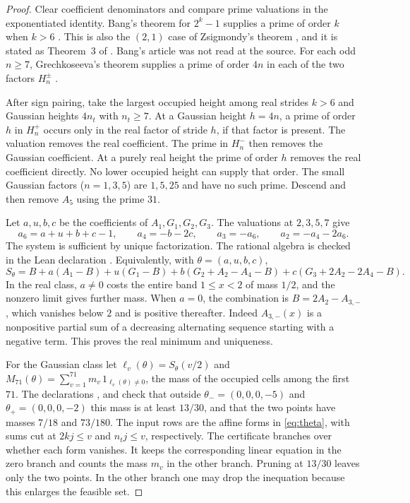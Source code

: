 \documentclass[11pt]{article}
\begin{document}
\begin{proof}
Clear coefficient denominators and compare prime valuations in the exponentiated identity. Bang's theorem for $2^k-1$ supplies a prime of order $k$ when $k>6$ \cite[pp.~70--80]{bang}. This is also the $(2,1)$ case of Zsigmondy's theorem \cite[\S XII, pp.~282--283]{zsigmondy}, and it is stated as Theorem~3 of \cite[p.~913]{bbg}. Bang's article was not read at the source. For each odd $n\ge7$, Grechkoseeva's theorem supplies a prime of order $4n$ in each of the two factors $H_n^\pm$ \cite[Theorem~2, p.~2, Suzuki case $(v,n,m)=(2,4,n)$]{grech}.

After sign pairing, take the largest occupied height among real strides $k>6$ and Gaussian heights $4n_t$ with $n_t\ge7$. At a Gaussian height $h=4n$, a prime of order $h$ in $H_n^+$ occurs only in the real factor of stride $h$, if that factor is present. The valuation removes the real coefficient. The prime in $H_n^-$ then removes the Gaussian coefficient. At a purely real height the prime of order $h$ removes the real coefficient directly. No lower occupied height can supply that order. The small Gaussian factors ($n=1,3,5$) are $1,5,25$ and have no such prime. Descend and then remove $A_5$ using the prime $31$.

Let $a,u,b,c$ be the coefficients of $A_1,G_1,G_2,G_3$. The valuations at $2,3,5,7$ give
\[
 a_6=a+u+b+c-1,\qquad a_4=-b-2c,\qquad
 a_3=-a_6,\qquad a_2=-a_4-2a_6.
\]
The system is sufficient by unique factorization. The rational algebra is checked in the Lean declaration
.
Equivalently, with $\theta=(a,u,b,c)$,
\begin{equation}\label{eq:theta}
 S_\theta=B+a(A_1-B)+u(G_1-B)+b(G_2+A_2-A_4-B)
                  +c(G_3+2A_2-2A_4-B).
\end{equation}
In the real class, $a\ne0$ costs the entire band $1\le x<2$ of mass $1/2$, and the nonzero limit gives further mass. When $a=0$, the combination is $B=2A_2-A_{3,-}$, which vanishes below $2$ and is positive thereafter. Indeed $A_{3,-}(x)$ is a nonpositive partial sum of a decreasing alternating sequence starting with a negative term. This proves the real minimum and uniqueness.

For the Gaussian class let $\ell_v(\theta)=S_\theta(v/2)$ and $M_{71}(\theta)=\sum_{v=1}^{71}m_v\,1_{\ell_v(\theta)\ne0}$, the mass of the occupied cells among the first $71$. The declarations
,
 and
check that outside $\theta_-=(0,0,0,-5)$ and $\theta_+=(0,0,0,-2)$ this mass is at least $13/30$, and that the two points have masses $7/18$ and $73/180$. The input rows are the affine forms in \eqref{eq:theta}, with sums cut at $2kj\le v$ and $n_tj\le v$, respectively. The certificate branches over whether each form vanishes. It keeps the corresponding linear equation in the zero branch and counts the mass $m_v$ in the other branch. Pruning at $13/30$ leaves only the two points. In the other branch one may drop the inequation because this enlarges the feasible set.


\end{proof}
\end{document}
